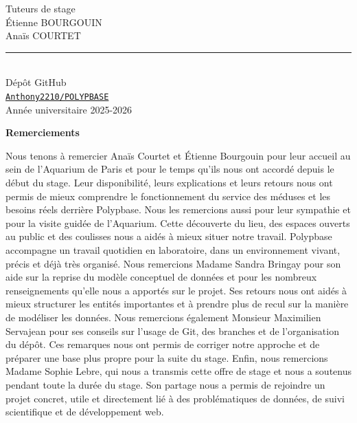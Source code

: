 \documentclass{article}
\begin{document}
\begin{titlepage}
  Tuteurs de stage\\[0.15cm]
  Étienne BOURGOUIN\\
  Anaïs COURTET\\

  \rule{0.5\textwidth}{0.9pt}\\[0.25cm]

  Dépôt GitHub\\[0.15cm]
  \href{https://github.com/Anthony2210/POLYPBASE}{\texttt{Anthony2210/POLYPBASE}}\\

  \vfill
  {\large Année universitaire 2025-2026}
\end{titlepage}

\newpage
\thispagestyle{empty}
\vspace*{3cm}
\begin{center}
{\Large \textbf{Remerciements}}
\end{center}

\vspace{1cm}
Nous tenons à remercier Anaïs Courtet et Étienne Bourgouin pour leur accueil au sein de l’Aquarium de Paris et pour le temps qu’ils nous ont accordé depuis le début du stage. Leur disponibilité, leurs explications et leurs retours nous ont permis de mieux comprendre le fonctionnement du service des méduses et les besoins réels derrière Polypbase.
Nous les remercions aussi pour leur sympathie et pour la visite guidée de l’Aquarium. Cette découverte du lieu, des espaces ouverts au public et des coulisses nous a aidés à mieux situer notre travail. Polypbase accompagne un travail quotidien en laboratoire, dans un environnement vivant, précis et déjà très organisé.
Nous remercions Madame Sandra Bringay pour son aide sur la reprise du modèle conceptuel de données et pour les nombreux renseignements qu’elle nous a apportés sur le projet. Ses retours nous ont aidés à mieux structurer les entités importantes et à prendre plus de recul sur la manière de modéliser les données.
Nous remercions également Monsieur Maximilien Servajean pour ses conseils sur l’usage de Git, des branches et de l’organisation du dépôt. Ces remarques nous ont permis de corriger notre approche et de préparer une base plus propre pour la suite du stage.
Enfin, nous remercions Madame Sophie Lebre, qui nous a transmis cette offre de stage et nous a soutenus pendant toute la durée du stage. Son partage nous a permis de rejoindre un projet concret, utile et directement lié à des problématiques de données, de suivi scientifique et de développement web.
\end{document}
